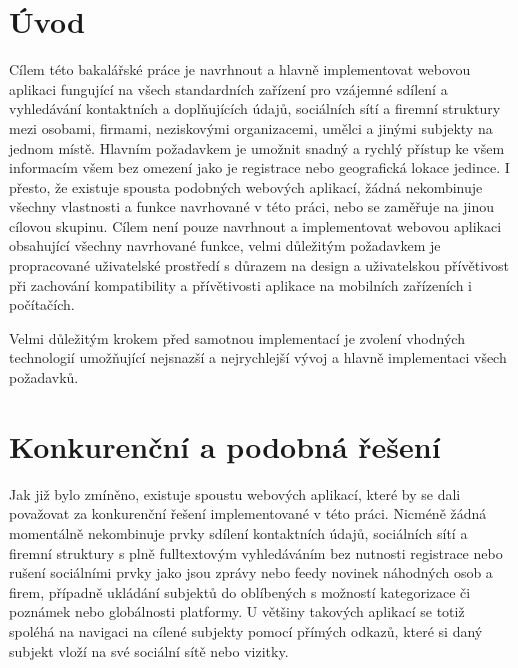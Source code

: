 \section{Úvod}


Cílem této bakalářské práce je navrhnout a hlavně implementovat webovou aplikaci fungující na všech standardních zařízení
pro vzájemné sdílení a vyhledávání kontaktních a doplňujících údajů, sociálních sítí a firemní struktury mezi osobami, firmami,
neziskovými organizacemi, umělci a jinými subjekty na jednom místě.
Hlavním požadavkem je umožnit snadný a rychlý přístup ke všem informacím všem bez omezení jako je registrace nebo
geografická lokace jedince.
I přesto, že existuje spousta podobných webových aplikací, žádná nekombinuje všechny vlastnosti a funkce navrhované
v této práci, nebo se zaměřuje na jinou cílovou skupinu.
Cílem není pouze navrhnout a implementovat webovou aplikaci obsahující všechny navrhované funkce, velmi důležitým
požadavkem je propracované uživatelské prostředí s důrazem na design a uživatelskou přívětivost při zachování kompatibility
a přívětivosti aplikace na mobilních zařízeních i počítačích.


Velmi důležitým krokem před samotnou implementací je zvolení vhodných technologií umožňující nejsnazší a nejrychlejší
vývoj a hlavně implementaci všech požadavků.

\section{Konkurenční a podobná řešení}

Jak již bylo zmíněno, existuje spoustu webových aplikací, které by se dali považovat za konkurenční řešení implementované
v této práci.
Nicméně žádná momentálně nekombinuje prvky sdílení kontaktních údajů, sociálních sítí a firemní struktury s plně
fulltextovým vyhledáváním bez nutnosti registrace nebo rušení sociálními prvky jako jsou zprávy nebo feedy novinek
náhodných osob a firem, případně ukládání subjektů do oblíbených s možností kategorizace či poznámek nebo globálnosti
platformy.
U většiny takových aplikací se totiž spoléhá na navigaci na cílené subjekty pomocí přímých odkazů, které si daný subjekt
vloží na své sociální sítě nebo vizitky.

